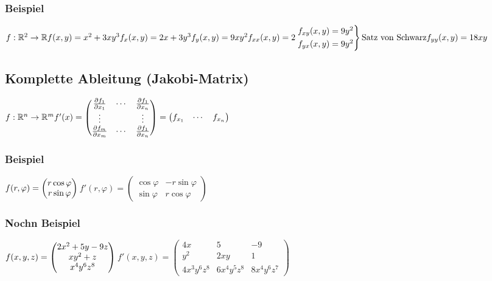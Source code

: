 \documentclass[a4paper,portrait]{scrartcl}
\begin{document}
\subsubsection{Beispiel}
$f: \mathbb{R}^2 \rightarrow \mathbb{R} \\
f(x,y) = x^2 + 3xy^3 \\
f_x(x,y) = 2x + 3y^3 \\
f_y(x,y) = 9xy^2 \\ \\
f_{xx}(x,y) = 2\\
\begin{rcases*}
	f_{xy}(x,y) = 9y^2 \\
	f_{yx}(x,y) = 9y^2 
\end{rcases*}
\text{Satz von Schwarz}\\
f_{yy}(x,y) = 18xy$
\subsection{Komplette Ableitung (Jakobi-Matrix)}
$ f: \mathbb{R}^n \rightarrow \mathbb{R}^m \\
f'(x) = 
\begin{pmatrix}
	\frac{\partial f_1}{\partial x_1} & \cdots & \frac{\partial f_1}{\partial x_n}  \\
	\vdots &  & \vdots  \\
	\frac{\partial f_m}{\partial x_m} & \cdots & \frac{\partial f_1}{\partial x_n} 
\end{pmatrix} =
\begin{pmatrix}
	f_{x_1} & \cdots & f_{x_n}
\end{pmatrix}
$
\subsubsection{Beispiel}
$ f(r,\varphi) =
\begin{pmatrix}
	r \cos \varphi \\
	r \sin \varphi
\end{pmatrix} \\
$$
f'(r, \varphi) =
\begin{pmatrix}
	\cos \varphi & -r \sin \varphi\\
	\sin \varphi & r \cos \varphi
\end{pmatrix}
$
\subsubsection{Nochn Beispiel}
$ f(x,y,z) =
\begin{pmatrix}
2x^2+5y-9z \\
xy^2+z \\
x^4y^6z^8
\end{pmatrix} \\
$$
f'(x,y,z) =
\begin{pmatrix}
4x & 5 & -9\\
y^2 & 2xy & 1 \\
4x^3y^6z^8 & 6x^4y^5z^8 & 8x^4y^6z^7
\end{pmatrix}
$
\end{document}
